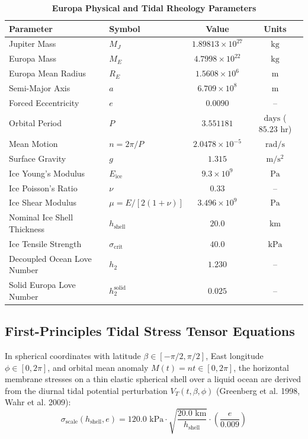\documentclass[11pt,a4paper]{article}
\begin{document}
\begin{table}[H]
\centering
\caption{\textbf{Europa Physical and Tidal Rheology Parameters}}
\label{tab:params}
\begin{tabular}{llcc}
\toprule
\textbf{Parameter} & \textbf{Symbol} & \textbf{Value} & \textbf{Units} \\
\midrule
Jupiter Mass & $M_J$ & $1.89813 \times 10^{27}$ & $\mathrm{kg}$ \\
Europa Mass & $M_E$ & $4.7998 \times 10^{22}$ & $\mathrm{kg}$ \\
Europa Mean Radius & $R_E$ & $1.5608 \times 10^6$ & $\mathrm{m}$ \\
Semi-Major Axis & $a$ & $6.709 \times 10^8$ & $\mathrm{m}$ \\
Forced Eccentricity & $e$ & $0.0090$ & -- \\
Orbital Period & $P$ & $3.551181$ & $\mathrm{days}$ ($85.23\text{ hr}$) \\
Mean Motion & $n = 2\pi/P$ & $2.0478 \times 10^{-5}$ & $\mathrm{rad/s}$ \\
Surface Gravity & $g$ & $1.315$ & $\mathrm{m/s^2}$ \\
Ice Young's Modulus & $E_{\mathrm{ice}}$ & $9.3 \times 10^9$ & $\mathrm{Pa}$ \\
Ice Poisson's Ratio & $\nu$ & $0.33$ & -- \\
Ice Shear Modulus & $\mu = E / [2(1+\nu)]$ & $3.496 \times 10^9$ & $\mathrm{Pa}$ \\
Nominal Ice Shell Thickness & $h_{\mathrm{shell}}$ & $20.0$ & $\mathrm{km}$ \\
Ice Tensile Strength & $\sigma_{\mathrm{crit}}$ & $40.0$ & $\mathrm{kPa}$ \\
Decoupled Ocean Love Number & $h_2$ & $1.230$ & -- \\
Solid Europa Love Number & $h_2^{\mathrm{solid}}$ & $0.025$ & -- \\
\bottomrule
\end{tabular}
\end{table}

\subsection{First-Principles Tidal Stress Tensor Equations}
In spherical coordinates with latitude $\beta \in [-\pi/2, \pi/2]$, East longitude $\phi \in [0, 2\pi]$, and orbital mean anomaly $M(t) = n t \in [0, 2\pi]$, the horizontal membrane stresses on a thin elastic spherical shell over a liquid ocean are derived from the diurnal tidal potential perturbation $V_T(t, \beta, \phi)$ (Greenberg et al. 1998, Wahr et al. 2009):
\begin{equation}
\sigma_{\mathrm{scale}}(h_{\mathrm{shell}}, e) = 120.0\text{ kPa} \cdot \sqrt{\frac{20.0\text{ km}}{h_{\mathrm{shell}}}} \cdot \left(\frac{e}{0.009}\right)
\end{equation}
\end{document}
